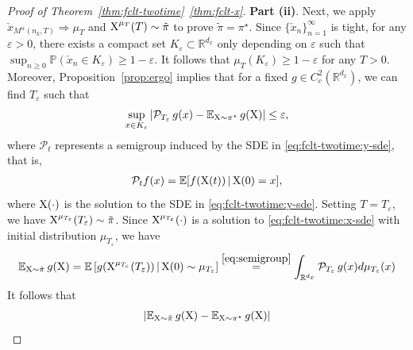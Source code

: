 \documentclass[11pt]{article}
\theoremstyle{plain}
\theoremstyle{definition}
\def\eps{{\varepsilon}}
\def\ermX{{\textnormal{X}}}
\def\PM{{\mathcal P}}
\def\RB{{\mathbb R}}
\def\EB{{\mathbb E}}
\def\PB{{\mathbb P}}
\newcommand{\xcheck}{{\check{x}}}
\newcommand{\xbar}{{\bar{\textnormal{X}}}}
\newcommand{\xx}{{x}}
\def\weakconverge{\Rightarrow}
\begin{document}
\begin{appendix}
\begin{proof}[Proof of Theorem~\ref{thm:fclt-twotime}~\ref{thm:fclt-x}]
    \textbf{Part (ii)}.
    Next, we apply $\xcheck_{M^\alpha(n_k, T)} \weakconverge \mu_T$ and $\ermX^{\mu_T}(T) \sim  \tilde{\pi}$ to prove $\tilde\pi = \pi^\star $.
    Since $\{ \xcheck_{n} \}_{n=1}^\infty$ is tight,  for any $\eps > 0$, there exists a compact set $K_\eps \subset \RB^{d_x}$ only depending on $\eps$ such that $\sup_{n \ge 0} \PB(\xcheck_{n} \in K_\eps) \ge 1 - \eps$.
    It follows that $\mu_T(K_\eps) \ge 1-\eps$ for any $T > 0$.
    Moreover,
    Proposition~\ref{prop:ergo} implies that for a fixed $g \in C_c^2(\RB^{d_x})$, we can find $T_\eps$ such that 
    \begin{equation}\label{eq:erg_diff}
        \sup_{\xx \in K_\eps} \left| \PM_{T_\eps}\, g(\xx)- \EB_{\ermX \sim \pi^\star}\, g(\ermX) \right| \le \eps,
    \end{equation}
    where $\PM_t$ represents a semigroup induced by the SDE in \eqref{eq:fclt-twotime:y-sde}, that is, 
    \begin{align}\label{eq:semigroup}
        \PM_t f(x) = \EB [ f(\ermX(t)) \,|\, \ermX(0) = x ],
    \end{align}
    where $\ermX(\cdot)$ is the solution to the SDE in \eqref{eq:fclt-twotime:y-sde}. 
    Setting $T = T_\eps$, we have $\ermX^{\mu_{T_\eps}}(T_\eps) \sim  \tilde{\pi}$.
    Since $\ermX^{\mu_{T_\eps}}(\cdot)$ is a solution to \eqref{eq:fclt-twotime:x-sde} with initial distribution $\mu_{T_\eps}$,  we have
    \begin{align*}
        \EB_{\ermX \sim \tilde\pi}\, g(\ermX)
        = \EB\, [ g (\ermX^{\mu_{T_\eps}}(T_\eps) ) \,|\, \ermX(0) \sim \mu_{T_\eps} ]
        \overset{\eqref{eq:semigroup}}{=} \int_{\RB^{d_x}} \PM_{T_\eps}\, g(\xx) d \mu_{T_\eps}(\xx)
    \end{align*}
    It follows that
    \begin{equation*}
        \begin{aligned}
            \left| \EB_{\ermX \sim \tilde\pi}\, g(\ermX) - \EB_{\ermX \sim \pi^\star}\, g(\ermX) \right|

\end{aligned}
\end{equation*}
\end{proof}
\end{appendix}
\end{document}
